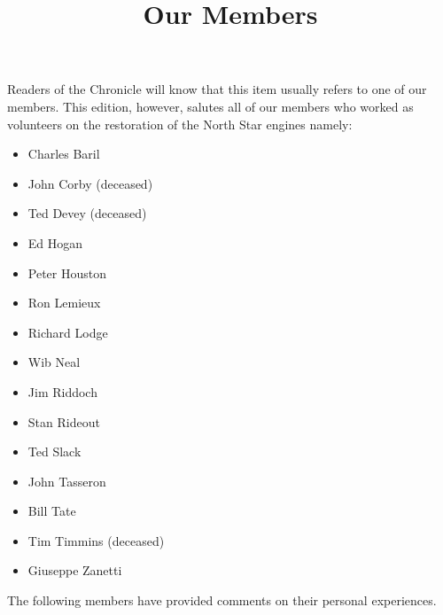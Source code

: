 %


\title{Our Members}

\maketitle




Readers of the Chronicle will know that this item usually refers to one of our
members. This edition, however, salutes all of our members who worked as
volunteers on the restoration of the North Star engines namely:

\begin{itemize}
  \item Charles Baril
  \item John Corby (deceased)
  \item Ted Devey (deceased)
  \item Ed Hogan
  \item Peter Houston
  \item Ron Lemieux
  \item Richard Lodge
  \item Wib Neal
  \item Jim Riddoch
  \item Stan Rideout
  \item Ted Slack
  \item John Tasseron
  \item Bill Tate
  \item Tim Timmins (deceased)
  \item Giuseppe Zanetti
\end{itemize}

The following members have provided comments on their personal experiences.

